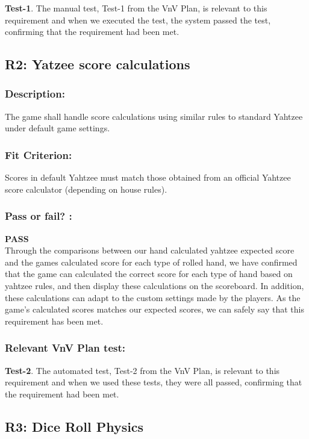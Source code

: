 \documentclass[12pt, titlepage]{article}
\begin{document}
  \noindent \textbf{ Test-1}. The manual test, Test-1 from the VnV Plan, is relevant to this requirement and when we executed the test, the system passed the test, confirming that the requirement had been met.


\subsection{R2: Yatzee score calculations}
\label{R2} 
  
   \subsubsection*{Description:}  The game shall handle score calculations using similar rules to standard Yahtzee under default game settings.

 \subsubsection*{Fit Criterion:}  Scores in default Yahtzee must match those obtained from an official Yahtzee score calculator (depending on house rules).
 
 \subsubsection*{Pass or fail? :}
 
 \noindent \textbf{PASS}\\
 
 Through the comparisons between our hand calculated yahtzee  expected score and the games calculated score for each type of rolled hand, we have confirmed that the game can calculated the correct score for each type of hand based on yahtzee rules, and then display these calculations on the scoreboard. In addition, these calculations can adapt to the custom settings made by the players. As the game's calculated scores matches our expected scores, we can safely say that this requirement has been met. 
 
 \subsubsection*{Relevant VnV Plan test: }  \textbf{ Test-2}. The automated test, Test-2 from the VnV Plan, is relevant to this requirement and when we used these tests, they were all passed, confirming that the requirement had been met.


\subsection{R3: Dice Roll Physics} 
\label{R3}  
  
\end{document}

